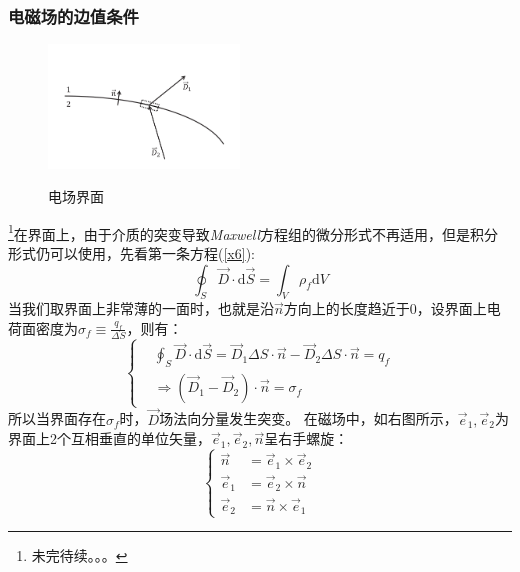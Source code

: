 \documentclass[12pt]{article}
\begin{document}
\subsubsection{电磁场的边值条件}
\begin{figure}
\begin{center}
	\includegraphics[width=2in]{F1.png}
	\label{F1}
\end{center}
\caption{电场界面}
\end{figure}
\footnote{未完待续。。。}在界面上，由于介质的突变导致\textit{Maxwell}方程组的微分形式不再适用，但是积分形式仍可以使用，先看第一条方程(\ref{x6}):
\begin{equation}
    \oint_S \Vec{D}\cdot\mathrm{d}\Vec{S}=\int_V \rho_f\mathrm{d}V
\end{equation}
当我们取界面上非常薄的一面时，也就是沿$\Vec{n}$方向上的长度趋近于0，设界面上电荷面密度为$\sigma_f\equiv \frac{q_f}{\Delta S} $，则有：
\begin{equation}\left\{
\begin{split}
&\oint_S \Vec{D}\cdot\mathrm{d}\Vec{S}=\Vec{D}_1\Delta S\cdot \Vec{n}-\Vec{D}_2\Delta S\cdot\Vec{n} = q_f
 \\ &\Rightarrow   (\Vec{D}_1-\Vec{D}_2)\cdot\Vec{n}=\sigma_f
\end{split}\right.
\end{equation}
所以当界面存在$\sigma_f$时，$\Vec{D}$场法向分量发生突变。%
在磁场中，如右图所示，$\Vec{e}_1, \Vec{e}_2$为界面上2个互相垂直的单位矢量，$\Vec{e}_1, \Vec{e}_2, \Vec{n}$呈右手螺旋：
\begin{equation}
\left\{\begin{split}
    \Vec{n}&=\Vec{e}_1\times \Vec{e}_2\\
    \Vec{e}_1&=\Vec{e}_2\times \Vec{n}\\
    \Vec{e}_2&=\Vec{n}\times \Vec{e}_1
    \end{split}\right.
\end{equation}
\end{document}

